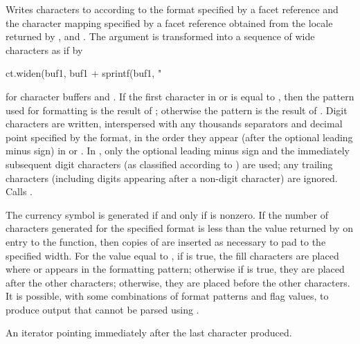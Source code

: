 \begin{itemdescr}
\pnum
\effects
Writes characters to
according to the format specified by a
facet reference
and the character mapping specified by a
facet reference
obtained from the locale returned by
,
and
.
The argument
is transformed into a sequence of wide characters as if by

\begin{codeblock}
ct.widen(buf1, buf1 + sprintf(buf1, "%
\end{codeblock}

for character buffers
and
.
If the first character in
or
is equal to
,
then the pattern used for formatting is the result of
;
otherwise the pattern is the result of
.
Digit characters are written, interspersed with any thousands separators
and decimal point specified by the format, in the order they appear
(after the optional leading minus sign)
in
or
.
In
,
only the optional leading minus sign and the immediately subsequent
digit characters (as classified according to
)
are used; any trailing characters (including digits appearing
after a non-digit character) are ignored.
Calls
.

\pnum
\notes
The currency symbol is generated if and only if
is nonzero.
If the number of characters generated for the specified format is less than the value
returned by
on entry to the function, then copies of
are inserted as necessary to pad to the specified width.
For the value
equal to
,
if
is true, the fill characters are placed where
or
appears in the formatting pattern; otherwise if
is true, they are placed after the other characters;
otherwise, they are placed before the other characters.
\enternote
It is possible, with some combinations of format patterns and flag values,
to produce output that cannot be parsed using
.
\exitnote

\pnum
\returns
An iterator pointing immediately after the last character produced.
\end{itemdescr}


